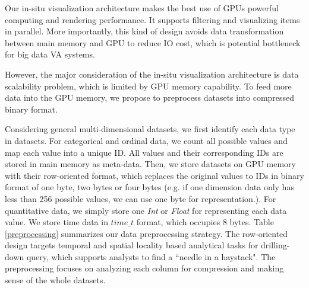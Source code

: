 Our in-situ visualization architecture makes the best use of GPUs powerful computing and rendering performance. It supports filtering and visualizing items in parallel. More importantly, this kind of design avoids data transformation between main memory and GPU to reduce IO cost, which is potential bottleneck for big data VA systems. 


However, the major consideration of the in-situ visualization architecture is data scalability problem, which is limited by GPU memory capability. To feed more data into the GPU memory, we propose to preprocess datasets into compressed binary format.



Considering general multi-dimensional datasets, we first identify each data type in datasets. For categorical and ordinal data, we count  all possible values and map each value into a unique ID. All values and their corresponding IDs are stored in main memory as meta-data. %
Then, we store datasets on GPU memory with their row-oriented format, which replaces the original values to  IDs  in binary format of one byte, two bytes or four bytes (e.g. if one dimension data only has less than 256 possible values, we can use one byte for representation.). For quantitative data, we simply store one \emph{Int} or \emph{Float} for representing each data value. We store  time data in \emph{$time\_t$} format, which occupies 8 bytes. Table \ref{preprocessing} summarizes our data preprocessing strategy. The row-oriented design targets temporal and spatial locality based analytical tasks for drilling-down query, which supports analysts to find  a ``needle in a haystack".  The preprocessing focuses on analyzing each column for compression and making sense of the whole datasets.


